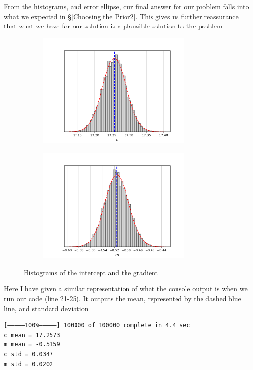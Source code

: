 \documentclass[12pt,twoside]{report}   %
\begin{document}
From the histograms, and error ellipse, our final answer for our problem falls into what we expected in \S\ref{Choosing the Prior2}. This gives us further reassurance that what we have for our solution is a plausible solution to the problem.
\begin{figure}[H]
\centering
\begin{subfigure}{0.5\linewidth}
  \centering
  \includegraphics[width = 3in]{Histc.pdf}
  \label{fig:subhist1}
\end{subfigure}%
\begin{subfigure}{0.5\linewidth}
  \centering
  \includegraphics[width = 3in]{Histm.pdf}
  \label{fig:subhist2}
\end{subfigure}
\caption{Histograms of the intercept and the gradient}
\label{fig:histograms1}
\end{figure}

Here I have given a similar representation of what the console output is when we run our code (line 21-25). It outputs the mean, represented by the dashed blue line, and standard deviation 
\small \begin{tcolorbox}[colback=black!5,colframe=black!40!black,title=\texttt{Terminal}]
\texttt{[--------------100\%--------------] 100000 of 100000 complete in 4.4 sec\\
c mean = 17.2573\\
m mean = -0.5159\\
c std = 0.0347\\
m std = 0.0202}
\end{tcolorbox}
\end{document}
